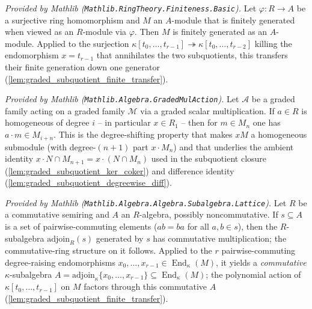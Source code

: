\begin{lemma}
  \label{lem:fg_restrictScalars_of_surjective_mathlib}
  \mathlibok
  \textit{Provided by Mathlib (\texttt{Mathlib.RingTheory.Finiteness.Basic}).}
  Let \(\varphi : R \to A\) be a surjective ring homomorphism and \(M\) an
  \(A\)-module that is finitely generated when viewed as an \(R\)-module via
  \(\varphi\). Then \(M\) is finitely generated as an \(A\)-module. Applied to the
  surjection \(\kappa[t_0, \dots, t_{r-1}] \twoheadrightarrow \kappa[t_0, \dots,
  t_{r-2}]\) killing the endomorphism \(x = t_{r-1}\) that annihilates the two
  subquotients, this transfers their finite generation down one generator
  (\cref{lem:graded_subquotient_finite_transfer}).
\end{lemma}

\begin{lemma}
  \label{lem:isHomogeneousElem_graded_smul_mathlib}
  \mathlibok
  \textit{Provided by Mathlib (\texttt{Mathlib.Algebra.GradedMulAction}).}
  Let \(\mathcal{A}\) be a graded family acting on a graded family \(\mathcal{M}\)
  via a graded scalar multiplication. If \(a \in R\) is homogeneous of degree
  \(i\) -- in particular \(x \in R_1\) -- then for \(m \in M_n\) one has
  \(a \cdot m \in M_{i+n}\). This is the degree-shifting property that makes \(xM\)
  a homogeneous submodule (with degree-\((n+1)\) part \(x \cdot M_n\)) and that
  underlies the ambient identity \(x \cdot N \cap M_{n+1} = x \cdot (N \cap M_n)\)
  used in the subquotient closure (\cref{lem:graded_subquotient_ker_coker}) and
  difference identity (\cref{lem:graded_subquotient_degreewise_diff}).
\end{lemma}

\begin{lemma}
  \label{lem:adjoinCommRingOfComm_mathlib}
  \mathlibok
  \textit{Provided by Mathlib
  (\texttt{Mathlib.Algebra.Algebra.Subalgebra.Lattice}).}
  Let \(R\) be a commutative semiring and \(A\) an \(R\)-algebra, possibly
  noncommutative. If \(s \subseteq A\) is a set of pairwise-commuting elements
  (\(a b = b a\) for all \(a, b \in s\)), then the \(R\)-subalgebra
  \(\mathrm{adjoin}_R(s)\) generated by \(s\) has commutative multiplication; the
  commutative-ring structure on it follows. Applied to the \(r\) pairwise-commuting degree-raising endomorphisms
  \(x_0, \dots, x_{r-1} \in \operatorname{End}_\kappa(M)\), it yields a
  \emph{commutative} \(\kappa\)-subalgebra \(A = \mathrm{adjoin}_\kappa\{x_0, \dots,
  x_{r-1}\} \subseteq \operatorname{End}_\kappa(M)\); the polynomial action of
  \(\kappa[t_0, \dots, t_{r-1}]\) on \(M\) factors through this commutative \(A\)
  (\cref{lem:graded_subquotient_finite_transfer}).
\end{lemma}

